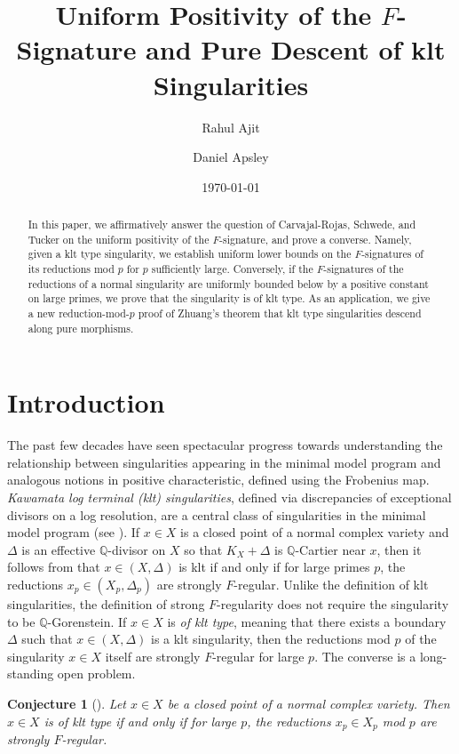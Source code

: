 \documentclass[11pt,leqno]{amsart}
\title{Uniform Positivity of the $F$-Signature and Pure Descent of klt Singularities}
\author{Rahul Ajit}
\author{Daniel Apsley}
\date{\today}
\numberwithin{equation}{section}
\newtheorem{conjecture}[theorem]{Conjecture}
\theoremstyle{definition}
\theoremstyle{remark}
\newcommand{\Q}{\mathbb{Q}}
\begin{document}
\begin{abstract}
In this paper, we affirmatively answer the question of Carvajal-Rojas, Schwede, and Tucker on the uniform positivity of the $F$-signature, and prove a converse. Namely, given a klt type singularity, we establish uniform lower bounds on the $F$-signatures of its reductions mod $p$ for $p$ sufficiently large. Conversely, if the $F$-signatures of the reductions of a normal singularity are uniformly bounded below by a positive constant on large primes, we prove that the singularity is of klt type. As an application, we give a new reduction-mod-$p$ proof of Zhuang's theorem that klt type singularities descend along pure morphisms.
\end{abstract}

\maketitle

\section{Introduction}
The past few decades have seen spectacular progress towards understanding the relationship between singularities appearing in the minimal model program and analogous notions in positive characteristic, defined using the Frobenius map. \textit{Kawamata log terminal (klt) singularities}, defined via discrepancies of exceptional divisors on a log resolution, are a central class of singularities in the minimal model program (see \cite[Definition 2.34]{kollarmori}). If $x \in X$ is a closed point of a normal complex variety and $\Delta$ is an effective $\Q$-divisor on $X$ so that $K_X + \Delta$ is $\Q$-Cartier near $x$, then it follows from \cite{HW02,takagi04} that $x \in (X, \Delta)$ is klt if and only if for large primes $p$, the reductions $x_p \in (X_p, \Delta_p)$ are strongly $F$-regular. Unlike the definition of klt singularities, the definition of strong $F$-regularity does not require the singularity to be $\Q$-Gorenstein. If $x \in X$ is \textit{of klt type}, meaning that there exists a boundary $\Delta$ such that $x \in (X, \Delta)$ is a klt singularity, then the reductions mod $p$ of the singularity $x \in X$ itself are strongly $F$-regular for large $p$. The converse is a long-standing open problem. 

\begin{conjecture}[{\cite[Problem 5.3.1]{HW02}}] \label{conj: HWGFRtype}
Let $x \in X$ be a closed point of a normal complex variety. Then $x \in X$ is of klt type if and only if for large $p$, the reductions $x_p \in X_p$ mod $p$ are strongly $F$-regular. 
\end{conjecture}
\end{document}
